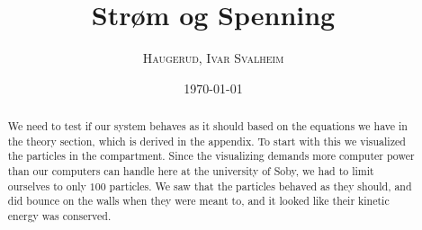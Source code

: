 \documentclass[%
 reprint,
 amsmath,amssymb,
 aps,
]{revtex4-1}
\begin{document}

\title{Strøm og Spenning}

\author{\textsc{Haugerud, Ivar Svalheim}}
%

\date{\today}

\begin{abstract}
We need to test if our system behaves as it should based on the equations we have in the theory section, which is derived in the appendix. To start with this we visualized the particles in the compartment. Since the visualizing demands more computer power than our computers can handle here at the university of Soby, we had to limit ourselves to only $100$ particles. We saw that the particles behaved as they should, and did bounce on the walls when they were meant to, and it looked like their kinetic energy was conserved.
\end{abstract}

\maketitle

\end{document}
